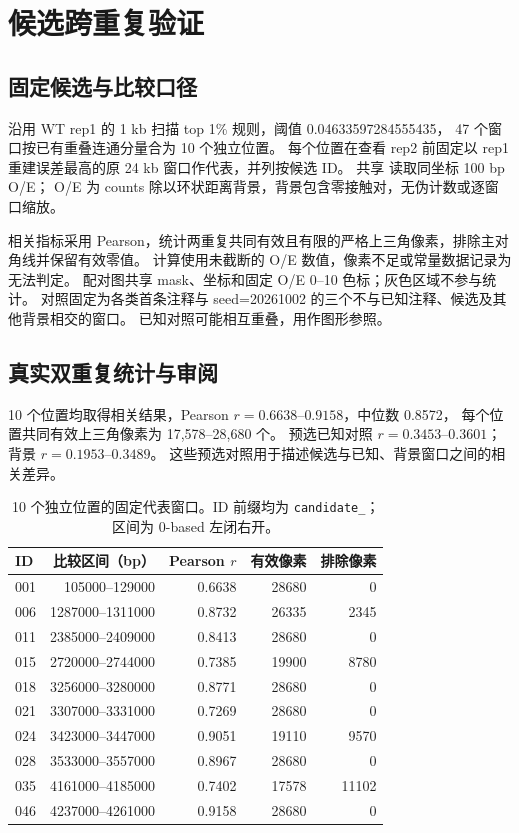 \section{候选跨重复验证}
\subsection{固定候选与比较口径}
沿用 WT rep1 的 1 kb 扫描 top 1\% 规则，阈值 0.04633597284555435，
47 个窗口按已有重叠连通分量合为 10 个独立位置。
每个位置在查看 rep2 前固定以 rep1 重建误差最高的原 24 kb 窗口作代表，并列按候选 ID。
共享  读取同坐标 100 bp O/E；
O/E 为 counts 除以环状距离背景，背景包含零接触对，无伪计数或逐窗口缩放。

相关指标采用 Pearson，统计两重复共同有效且有限的严格上三角像素，排除主对角线并保留有效零值。
计算使用未截断的 O/E 数值，像素不足或常量数据记录为无法判定。
配对图共享 mask、坐标和固定 O/E 0--10 色标；灰色区域不参与统计。
对照固定为各类首条注释与 seed=20261002 的三个不与已知注释、候选及其他背景相交的窗口。
已知对照可能相互重叠，用作图形参照。

\subsection{真实双重复统计与审阅}
10 个位置均取得相关结果，Pearson $r=0.6638$--$0.9158$，中位数 0.8572，
每个位置共同有效上三角像素为 17,578--28,680 个。
预选已知对照 $r=0.3453$--$0.3601$；背景 $r=0.1953$--$0.3489$。
这些预选对照用于描述候选与已知、背景窗口之间的相关差异。

\begin{table}[htbp]
\centering\small
\caption{10 个独立位置的固定代表窗口。ID 前缀均为 \texttt{candidate\_}；区间为 0-based 左闭右开。}
\begin{tabular}{lrrrr}
\toprule
ID & 比较区间（bp） & Pearson $r$ & 有效像素 & 排除像素 \\
\midrule
001 & 105000--129000 & 0.6638 & 28680 & 0 \\
006 & 1287000--1311000 & 0.8732 & 26335 & 2345 \\
011 & 2385000--2409000 & 0.8413 & 28680 & 0 \\
015 & 2720000--2744000 & 0.7385 & 19900 & 8780 \\
018 & 3256000--3280000 & 0.8771 & 28680 & 0 \\
021 & 3307000--3331000 & 0.7269 & 28680 & 0 \\
024 & 3423000--3447000 & 0.9051 & 19110 & 9570 \\
028 & 3533000--3557000 & 0.8967 & 28680 & 0 \\
035 & 4161000--4185000 & 0.7402 & 17578 & 11102 \\
046 & 4237000--4261000 & 0.9158 & 28680 & 0 \\
\bottomrule
\end{tabular}
\end{table}

